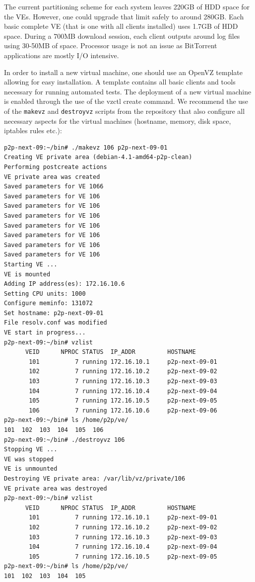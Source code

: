 The current partitioning scheme for each system leaves 220GB of HDD space for
the VEs. However, one could upgrade that limit safely to around 280GB. Each
basic complete VE (that is one with all clients installed) uses 1.7GB of HDD
space. During a 700MB download session, each client outputs around log files
using 30-50MB of space. Processor usage is not an issue as BitTorrent
applications are mostly I/O intensive.

In order to install a new virtual machine, one should use an OpenVZ template
allowing for easy installation. A template contains all basic clients and
tools necessary for running automated tests. The deployment of a new virtual
machine is enabled through the use of the vzctl create command. We recommend
the use of the \texttt{makevz} and \texttt{destroyvz} scripts from the
repository that also configure all necessary aspects for the virtual machines
(hostname, memory, disk space, iptables rules etc.):

\footnotesize
\begin{verbatim}
p2p-next-09:~/bin# ./makevz 106 p2p-next-09-01
Creating VE private area (debian-4.1-amd64-p2p-clean)
Performing postcreate actions
VE private area was created
Saved parameters for VE 1066
Saved parameters for VE 106
Saved parameters for VE 106
Saved parameters for VE 106
Saved parameters for VE 106
Saved parameters for VE 106
Saved parameters for VE 106
Saved parameters for VE 106
Starting VE ...
VE is mounted
Adding IP address(es): 172.16.10.6
Setting CPU units: 1000
Configure meminfo: 131072
Set hostname: p2p-next-09-01
File resolv.conf was modified
VE start in progress...
p2p-next-09:~/bin# vzlist
      VEID      NPROC STATUS  IP_ADDR         HOSTNAME
       101          7 running 172.16.10.1     p2p-next-09-01
       102          7 running 172.16.10.2     p2p-next-09-02
       103          7 running 172.16.10.3     p2p-next-09-03
       104          7 running 172.16.10.4     p2p-next-09-04
       105          7 running 172.16.10.5     p2p-next-09-05
       106          7 running 172.16.10.6     p2p-next-09-06
p2p-next-09:~/bin# ls /home/p2p/ve/
101  102  103  104  105  106
p2p-next-09:~/bin# ./destroyvz 106
Stopping VE ...
VE was stopped
VE is unmounted
Destroying VE private area: /var/lib/vz/private/106
VE private area was destroyed
p2p-next-09:~/bin# vzlist
      VEID      NPROC STATUS  IP_ADDR         HOSTNAME
       101          7 running 172.16.10.1     p2p-next-09-01
       102          7 running 172.16.10.2     p2p-next-09-02
       103          7 running 172.16.10.3     p2p-next-09-03
       104          7 running 172.16.10.4     p2p-next-09-04
       105          7 running 172.16.10.5     p2p-next-09-05
p2p-next-09:~/bin# ls /home/p2p/ve/
101  102  103  104  105
\end{verbatim}
\normalsize

